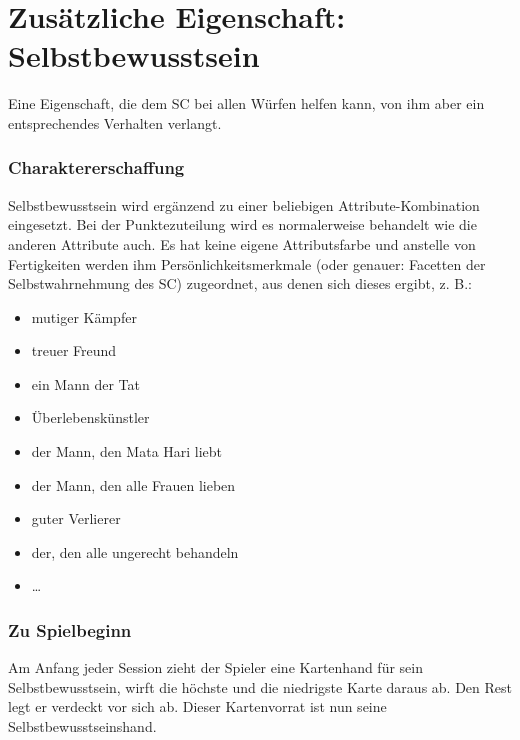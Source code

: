 \section{Zusätzliche Eigenschaft: Selbstbewusstsein}
Eine Eigenschaft, die dem SC bei allen Würfen helfen kann, von ihm aber ein entsprechendes Verhalten verlangt.

\subsubsection{Charaktererschaffung}

Selbstbewusstsein wird ergänzend zu einer beliebigen Attribute-Kombination eingesetzt. Bei der Punktezuteilung wird es normalerweise behandelt wie die anderen Attribute auch. Es hat keine eigene Attributsfarbe und anstelle von Fertigkeiten werden ihm Persönlichkeitsmerkmale (oder genauer: Facetten der Selbstwahrnehmung des SC) zugeordnet, aus denen sich dieses ergibt, z. B.:

\begin{itemize}
\item mutiger Kämpfer
\item treuer Freund
\item ein Mann der Tat
\item Überlebenskünstler
\item der Mann, den Mata Hari liebt
\item der Mann, den alle Frauen lieben
\item guter Verlierer
\item der, den alle ungerecht behandeln
\item \dots
\end{itemize}

\subsubsection{Zu Spielbeginn}
Am Anfang jeder Session zieht der Spieler eine Kartenhand für sein Selbstbewusstsein, wirft die höchste und die niedrigste Karte daraus ab. Den Rest legt er verdeckt vor sich ab. Dieser Kartenvorrat ist nun seine Selbstbewusstseinshand.

